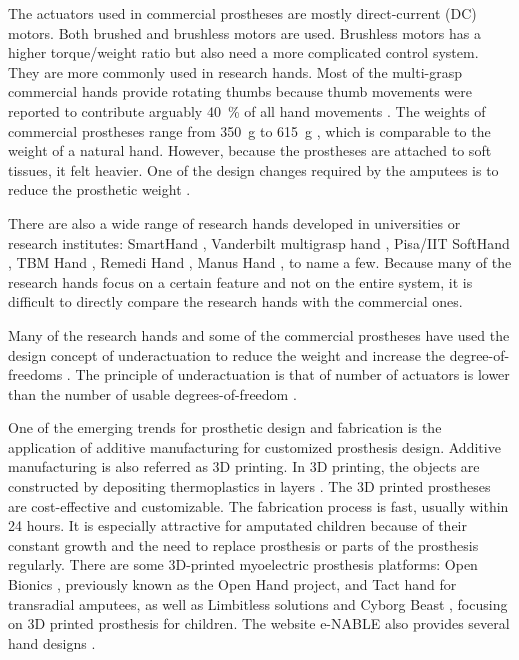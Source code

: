 The actuators used in commercial prostheses are mostly direct-current (DC) motors. Both brushed and brushless motors are used. Brushless motors has a higher torque/weight ratio but also need a more complicated control system. They are more commonly used in research hands. 
Most of the multi-grasp commercial hands provide rotating thumbs because thumb movements were reported to contribute arguably \SI{40}{\%} of all hand movements \cite{michael2004atlas}.  The weights of commercial prostheses range from \SI{350}{g} to \SI{615}{g} \cite{belter2013mechanical}, which is comparable to the weight of a natural hand. %
However, because the prostheses are attached to soft tissues, it felt heavier.  One of the design changes required by the amputees is to reduce the prosthetic weight \cite{cordella2016literature}.

 
There are also a wide range of research hands developed in universities or research institutes: SmartHand \cite{carrozza2006design}, Vanderbilt multigrasp hand \cite{dalley2010multigrasp}, Pisa/IIT SoftHand \cite{catalano2014adaptive}, TBM Hand \cite{dechev2001multiple}, Remedi Hand \cite{light2000development}, Manus Hand \cite{pons2004manus}, to name a few. Because many of the research hands focus on a certain feature and not on the entire system, it is difficult to directly compare the research hands with the commercial ones. 

Many of the research hands and some of the commercial prostheses have used the design concept of underactuation to reduce the weight and increase the degree-of-freedoms \cite{belter2013mechanical}. The principle of underactuation is that of number of actuators is lower  than the number of  usable degrees-of-freedom \cite{kyberd2011use}.


One of the emerging trends for prosthetic design and fabrication is the application of additive manufacturing for customized prosthesis design. Additive manufacturing is also referred as 3D printing. In 3D printing, the objects are constructed by depositing thermoplastics in layers \cite{ventola2014medical}.  
The 3D printed prostheses are cost-effective and customizable. The fabrication process is fast, usually within 24 hours. It is especially attractive for amputated children because of their constant growth and the need to replace prosthesis or parts of the prosthesis regularly. 
There are some 3D-printed myoelectric prosthesis platforms: Open Bionics \cite{open_bionics}, previously known as the Open Hand project, and Tact hand \cite{slade2015tact} for transradial amputees,  as well as Limbitless solutions \cite{limbitless_solutions} and Cyborg Beast \cite{zuniga2015cyborg}, focusing on 3D printed prosthesis for children. The website e-NABLE also provides several hand designs \cite{enabling_the_future}.

